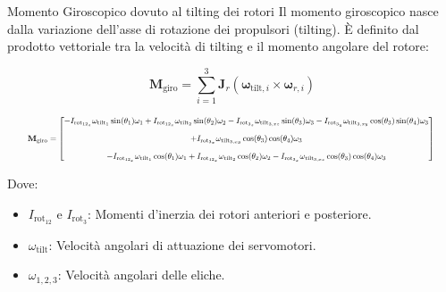 \documentclass[aspectratio=169]{beamer} %
\begin{document}
\begin{frame}{Momento Giroscopico dovuto al tilting dei rotori}
    Il momento giroscopico nasce dalla variazione dell'asse di rotazione dei propulsori (tilting). È definito dal prodotto vettoriale tra la velocità di tilting e il momento angolare del rotore:

    \begin{equation}
        \bm{M}_{\text{giro}} = \sum_{i=1}^{3} \mathbf{J}_{r} (\bm{\omega}_{\text{tilt},i} \times \bm{\omega}_{r,i})
    \end{equation}

    \begin{equation}
    \resizebox{0.95\textwidth}{!}{%
        $
        \mathbf{M}_{\text{giro}} = 
        \begin{bmatrix}
            -I_{\text{rot}_{12_z}} \omega_{\text{tilt}_1} \sin(\theta_1)\omega_1 
            + I_{\text{rot}_{12_z}} \omega_{\text{tilt}_2} \sin(\theta_2)\omega_2 
            - I_{\text{rot}_{3_z}} \omega_{\text{tilt}_{3,xz}} \sin(\theta_3)\omega_3 
            - I_{\text{rot}_{3_y}} \omega_{\text{tilt}_{3,xy}} \cos(\theta_3) \sin(\theta_4)\omega_3 
            \\[1em] %
            + I_{\text{rot}_{3_x}} \omega_{\text{tilt}_{3,xy}} \cos(\theta_3) \cos(\theta_4)\omega_3 
            \\[1em]
            -I_{\text{rot}_{12_x}} \omega_{\text{tilt}_1} \cos(\theta_1)\omega_1 
            + I_{\text{rot}_{12_x}} \omega_{\text{tilt}_2} \cos(\theta_2)\omega_2 
            - I_{\text{rot}_{3_x}} \omega_{\text{tilt}_{3,xz}} \cos(\theta_3) \cos(\theta_4)\omega_3
        \end{bmatrix}
        $
    }
    \end{equation}

    \vspace{0.2cm}
    \footnotesize
    Dove:
    \begin{itemize}
        \item $I_{\text{rot}_{12}}$ e $I_{\text{rot}_{3}}$: Momenti d'inerzia dei rotori anteriori e posteriore.
        \item $\omega_{\text{tilt}}$: Velocità angolari di attuazione dei servomotori.
        \item $\omega_{1,2,3}$: Velocità angolari delle eliche.
    \end{itemize}
\end{frame}
\end{document}
